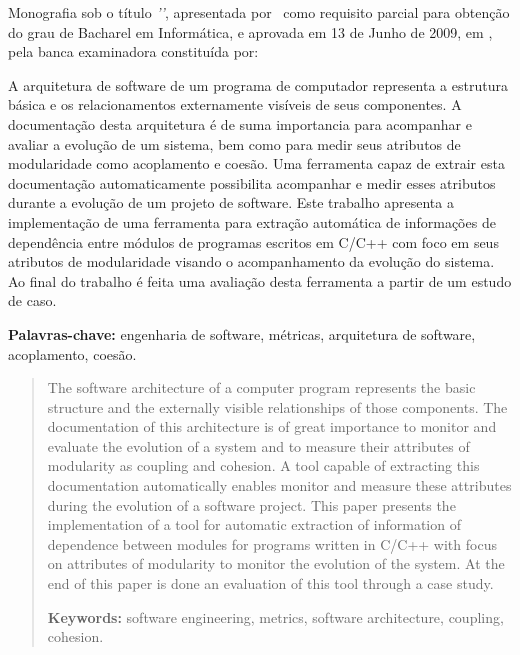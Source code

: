

\capa
\folhaderosto

\begin{folhadeaprovacao}
 Monografia sob o título \textit{'\ABNTtitulodata'}, apresentada por
 \ABNTautordata\ como requisito parcial para obtenção do grau de Bacharel em
 Informática, e aprovada em 13 de Junho de 2009, em \ABNTlocaldata, pela banca
 examinadora constituída por:
\end{folhadeaprovacao}

\begin{resumo}
A arquitetura de software de um programa de computador representa a estrutura
básica e os relacionamentos externamente visíveis de seus componentes. A
documentação desta arquitetura é de suma importancia para acompanhar e avaliar
a evolução de um sistema, bem como para medir seus atributos de modularidade
como acoplamento e coesão. Uma ferramenta capaz de extrair esta documentação
automaticamente possibilita acompanhar e medir esses atributos durante a
evolução de um projeto de software. Este trabalho apresenta a implementação de
uma ferramenta para extração automática de informações de dependência entre
módulos de programas escritos em C/C++ com foco em seus atributos de
modularidade visando o acompanhamento da evolução do sistema. Ao final do
trabalho é feita uma avaliação desta ferramenta a partir de um
estudo de caso.

{\bf Palavras-chave:} engenharia de software, métricas, arquitetura de
software, acoplamento, coesão.
\end{resumo}

\begin{abstract}
The software architecture of a computer program represents the basic structure
and the externally visible relationships of those components. The documentation
of this architecture is of great importance to monitor and evaluate the
evolution of a system and to measure their attributes of modularity as coupling
and cohesion. A tool capable of extracting this documentation automatically
enables monitor and measure these attributes during the evolution of a software
project. This paper presents the implementation of a tool for automatic
extraction of information of dependence between modules for programs written in
C/C++ with focus on attributes of modularity to monitor the evolution of the
system. At the end of this paper is done an evaluation of this
tool through a case study.

{\bf Keywords:} software engineering, metrics, software architecture, coupling,
cohesion.
\end{abstract}

\sumario
\listadefiguras
\listadetabelas
\listadesiglas

{}
\clearpage
\apendice


